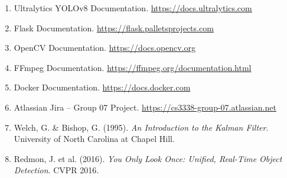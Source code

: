 \documentclass[12pt]{article}
\begin{document}
\begin{enumerate}[noitemsep]
    \item Ultralytics YOLOv8 Documentation. \url{https://docs.ultralytics.com}
    \item Flask Documentation. \url{https://flask.palletsprojects.com}
    \item OpenCV Documentation. \url{https://docs.opencv.org}
    \item FFmpeg Documentation. \url{https://ffmpeg.org/documentation.html}
    \item Docker Documentation. \url{https://docs.docker.com}
    \item Atlassian Jira -- Group 07 Project. \url{https://cs3338-group-07.atlassian.net}
    \item Welch, G. \& Bishop, G. (1995). \textit{An Introduction to the Kalman Filter}.
          University of North Carolina at Chapel Hill.
    \item Redmon, J. et al. (2016). \textit{You Only Look Once: Unified, Real-Time
          Object Detection}. CVPR 2016.
\end{enumerate}
\end{document}
